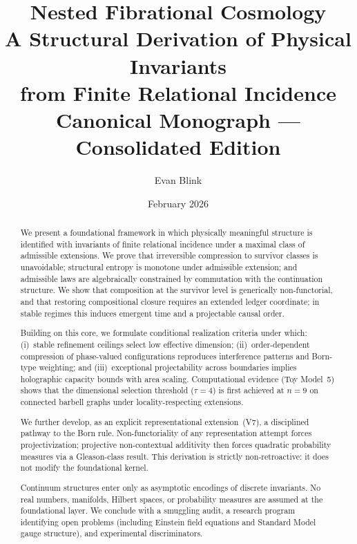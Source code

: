 \documentclass[11pt,a4paper]{article}
\title{%
  \textbf{Nested Fibrational Cosmology}\\[6pt]
  \large A Structural Derivation of Physical Invariants\\
  from Finite Relational Incidence\\[12pt]
  \normalsize Canonical Monograph --- Consolidated Edition
}
\author{Evan Blink}
\date{February 2026}
\theoremstyle{definition}
\theoremstyle{remark}
\begin{document}
\maketitle
\thispagestyle{empty}

\begin{abstract}
We present a foundational framework in which physically meaningful structure is identified with invariants of finite relational incidence under a maximal class of admissible extensions. We prove that irreversible compression to survivor classes is unavoidable; structural entropy is monotone under admissible extension; and admissible laws are algebraically constrained by commutation with the continuation structure. We show that composition at the survivor level is generically non-functorial, and that restoring compositional closure requires an extended ledger coordinate; in stable regimes this induces emergent time and a projectable causal order.

Building on this core, we formulate conditional realization criteria under which: (i)~stable refinement ceilings select low effective dimension; (ii)~order-dependent compression of phase-valued configurations reproduces interference patterns and Born-type weighting; and (iii)~exceptional projectability across boundaries implies holographic capacity bounds with area scaling. Computational evidence (Toy Model~5) shows that the dimensional selection threshold ($\tau = 4$) is first achieved at $n = 9$ on connected barbell graphs under locality-respecting extensions.

We further develop, as an explicit representational extension~(V7), a disciplined pathway to the Born rule. Non-functoriality of any representation attempt forces projectivization; projective non-contextual additivity then forces quadratic probability measures via a Gleason-class result. This derivation is strictly non-retroactive: it does not modify the foundational kernel.

Continuum structures enter only as asymptotic encodings of discrete invariants. No real numbers, manifolds, Hilbert spaces, or probability measures are assumed at the foundational layer. We conclude with a smuggling audit, a research program identifying open problems (including Einstein field equations and Standard Model gauge structure), and experimental discriminators.
\end{abstract}

\newpage
\end{document}
